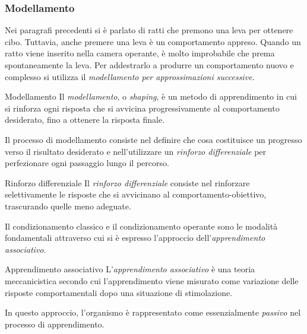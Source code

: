\documentclass[a4paper]{article}
\begin{document}
\subsubsection{Modellamento}
Nei paragrafi precedenti si è parlato di ratti che premono una leva per ottenere cibo. Tuttavia, anche premere una leva è un comportamento appreso. Quando un ratto viene inserito nella camera operante, è molto improbabile che prema spontaneamente la leva. Per addestrarlo a produrre un comportamento nuovo e complesso si utilizza il \emph{modellamento per approssimazioni successive}.
\begin{snippetdefinition}{Modellamento}
    Il \emph{modellamento}, o \emph{shaping}, è un metodo di apprendimento in cui si rinforza ogni risposta che si avvicina progressivamente al comportamento desiderato, fino a ottenere la risposta finale.
\end{snippetdefinition}
Il processo di modellamento consiste nel definire che cosa costituisce un progresso verso il risultato desiderato e nell'utilizzare un \emph{rinforzo differenziale} per perfezionare ogni passaggio lungo il percorso.
\begin{snippetdefinition}{Rinforzo differenziale}
    Il \emph{rinforzo differenziale} consiste nel rinforzare selettivamente le risposte che si avvicinano al comportamento-obiettivo, trascurando quelle meno adeguate.
\end{snippetdefinition}
Il condizionamento classico e il condizionamento operante sono le modalità fondamentali attraverso cui si è espresso l'approccio dell'\emph{apprendimento associativo}.
\begin{snippetdefinition}{Apprendimento associativo}
    L'\emph{apprendimento associativo} è una teoria meccanicistica secondo cui l'apprendimento viene misurato come variazione delle risposte comportamentali dopo una situazione di stimolazione.
\end{snippetdefinition}
In questo approccio, l'organismo è rappresentato come essenzialmente \emph{passivo} nel processo di apprendimento.
\end{document}
